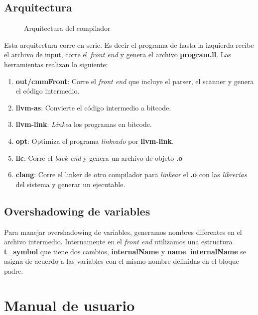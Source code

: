\documentclass[11pt]{article}
\begin{document}
\subsection{Arquitectura}

\begin{figure}[H]
    \centering
    \caption{Arquitectura del compilador}
    \label{fig:arch}
\end{figure}

Esta arquitectura corre en serie. Es decir el programa de hasta la izquierda recibe el archivo de input, corre el \textit{front end} y genera el archivo \textbf{program.ll}. Las herramientas realizan lo siguiente:

\begin{enumerate}
	\item \textbf{out/cmmFront}: Corre el \textit{front end} que incluye el parser, el scanner y genera el código intermedio.
	\item \textbf{llvm-as}: Convierte el código intermedio a bitcode.
	\item \textbf{llvm-link}: \textit{Linkea} los programas en bitcode.
	\item \textbf{opt}: Optimiza el programa \textit{linkeado} por \textbf{llvm-link}.
	\item \textbf{llc}: Corre el \textit{back end} y genera un archivo de objeto \textbf{.o}
	\item \textbf{clang}: Corre el linker de otro compilador para \textit{linkear} el \textbf{.o} con las \textit{librerías} del sistema y generar un ejecutable.
\end{enumerate}

\subsection{Overshadowing de variables}

Para manejar overshadowing de variables, generamos nombres diferentes en el archivo intermedio. Internamente en el \textit{front end} utilizamos una estructura \textbf{t\_symbol} que tiene dos cambios, \textbf{internalName} y \textbf{name}. \textbf{internalName} se asigna de acuerdo a las variables con el mismo nombre definidas en el bloque padre.

\pagebreak

\section{Manual de usuario}
\end{document}
